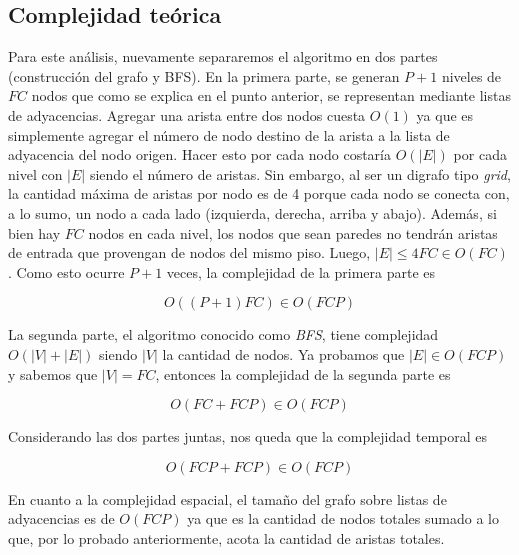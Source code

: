     \subsection{Complejidad teórica}

      Para este análisis, nuevamente separaremos el algoritmo en dos partes (construcción del grafo y BFS). En la primera parte, se generan $P+1$ niveles de $FC$ nodos que como se explica en el punto anterior, se representan mediante listas de adyacencias. Agregar una arista entre dos nodos cuesta $O(1)$ ya que es simplemente agregar el número de nodo destino de la arista a la lista de adyacencia del nodo origen. Hacer esto por cada nodo costaría $O(|E|)$ por cada nivel con $|E|$ siendo el número de aristas. Sin embargo, al ser un digrafo tipo \textit{grid}, la cantidad máxima de aristas por nodo es de 4 porque cada nodo se conecta con, a lo sumo, un nodo a cada lado (izquierda, derecha, arriba y abajo). Además, si bien hay $FC$ nodos en cada nivel, los nodos que sean paredes no tendrán aristas de entrada que provengan de nodos del mismo piso. Luego, $|E| \leq 4FC \in O(FC)$. Como esto ocurre $P+1$ veces, la complejidad de la primera parte es

      \[
        O((P+1)FC) \in O(FCP)
      \]


      La segunda parte, el algoritmo conocido como \textit{BFS}, tiene complejidad $O(|V| + |E|)$ siendo $|V|$ la cantidad de nodos. Ya probamos que $|E| \in O(FCP)$ y sabemos que $|V| = FC$, entonces la complejidad de la segunda parte es

      \[
        O(FC + FCP) \in O(FCP)
      \]

      Considerando las dos partes juntas, nos queda que la complejidad temporal es

      \[
        O(FCP + FCP) \in O(FCP)
      \]

      En cuanto a la complejidad espacial, el tamaño del grafo sobre listas de adyacencias es de $O(FCP)$ ya que es la cantidad de nodos totales sumado a lo que, por lo probado anteriormente, acota la cantidad de aristas totales.



